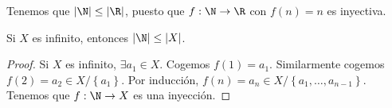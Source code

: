 \begin{observation}
\normalfont Tenemos que $\displaystyle \left|\N\right| \leq \left|\R\right| $, puesto que $\displaystyle f : \N \to \R $ con $\displaystyle f\left(n\right) = n $ es inyectiva.
\end{observation}

\begin{fprop}[]
\normalfont Si $\displaystyle X $ es infinito, entonces $\displaystyle \left|\N\right| \leq \left|X\right| $.
\end{fprop}
\begin{proof}
	Si $\displaystyle X $ es infinito, $\displaystyle \exists a_{1} \in X $. Cogemos $\displaystyle f\left(1\right) = a_{1} $. Similarmente cogemos $\displaystyle f\left(2\right) = a_{2} \in X/ \left\{ a_{1}\right\}  $. Por inducción, $\displaystyle f\left(n\right) = a_{n} \in X/ \left\{ a_{1}, \ldots, a_{n-1}\right\}  $. Tenemos que $\displaystyle f : \N \to X $ es una inyección.
\end{proof}

